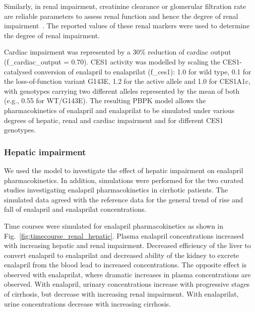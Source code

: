 \documentclass[pharmaceutics,article,submit,pdftex,moreauthors]{Definitions/mdpi}
\begin{document}
Similarly, in renal impairment, creatinine clearance or glomerular filtration rate are reliable parameters to assess renal function and hence the degree of renal impairment~\cite{Hockings1986}. The reported values of these renal markers were used to determine the degree of renal impairment.

Cardiac impairment was represented by a 30\% reduction of cardiac output (f\_cardiac\_output = 0.70). CES1 activity was modelled by scaling the CES1-catalysed conversion of enalapril to enalaprilat (f\_ces1): 1.0 for wild type, 0.1 for the loss-of-function variant G143E, 1.2 for the active allele and 1.0 for CES1A1c, with genotypes carrying two different alleles represented by the mean of both (e.g., 0.55 for WT/G143E). The resulting PBPK model allows the pharmacokinetics of enalapril and enalaprilat to be simulated under various degrees of hepatic, renal and cardiac impairment and for different CES1 genotypes.

\subsubsection{Hepatic impairment}\label{sec:results_hepatic_scans}

We used the model to investigate the effect of hepatic impairment on enalapril pharmacokinetics. In addition, simulations were performed for the two curated studies investigating enalapril pharmacokinetics in cirrhotic patients. The simulated data agreed with the reference data for the general trend of rise and fall of enalapril and enalaprilat concentrations.


Time courses were simulated for enalapril pharmacokinetics as shown in Fig.~\ref{fig:timecourse_renal_hepatic}. Plasma enalapril concentrations increased with increasing hepatic and renal impairment. Decreased efficiency of the liver to convert enalapril to enalaprilat and decreased ability of the kidney to excrete enalapril from the blood lead to increased concentrations. The opposite effect is observed with enalaprilat, where dramatic increases in plasma concentrations are observed. With enalapril, urinary concentrations increase with progressive stages of cirrhosis, but decrease with increasing renal impairment. With enalaprilat, urine concentrations decrease with increasing cirrhosis.    
\end{document}
